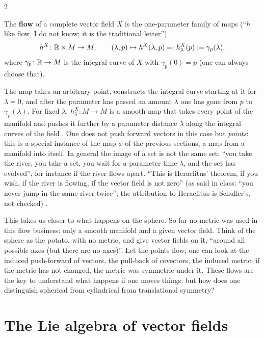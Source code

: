 \begin{paracol}{2}
\begin{definition}\label{def:c11-flow}
The \textbf{flow} of a complete vector field $X$ is the one-parameter family of maps (``$h$ like flow, I do not know; it is the traditional letter'')
\[
  h^X\colon\mathbb{R}\times M\to M,\qquad(\lambda,p)\mapsto h^X(\lambda,p)=:h^X_\lambda(p):=\gamma_p(\lambda),
\]
where $\gamma_p\colon\mathbb{R}\to M$ is the integral curve of $X$ with $\gamma_p(0)=p$ (one can always choose that).
\end{definition}
The map takes an arbitrary point, constructs the integral curve starting at it for $\lambda=0$, and after the parameter has passed an amount $\lambda$ one has gone from $p$ to $\gamma_p(\lambda)$. For fixed $\lambda$, $h^X_\lambda\colon M\to M$ is a smooth map that takes every point of the manifold and pushes it further by a parameter distance $\lambda$ along the integral curves of the field .
One does not push forward vectors in this case but \emph{points}: this is a special instance of the map $\phi$ of the previous sections, a map from a manifold into itself. In general the image of a set is not the same set: ``you take the river, you take a set, you wait for a parameter time $\lambda$, and the set has evolved'', for instance if the river flows apart. ``This is Heraclitus' theorem, if you wish, if the river is flowing, if the vector field is not zero'' (as said in class: ``you never jump in the same river twice''; the attribution to Heraclitus is Schuller's, not checked) .

This takes us closer to what happens on the sphere. So far no metric was used in this flow business: only a smooth manifold and a given vector field. Think of the sphere as the potato, with no metric, and give vector fields on it, ``around all possible axes (but there are no axes)''. Let the points flow; one can look at the induced push-forward of vectors, the pull-back of covectors, the induced metric: if the metric has not changed, the metric was symmetric under it. These flows are the key to understand what happens if one moves things; but how does one distinguish spherical from cylindrical from translational symmetry? 

\section{The Lie algebra of vector fields}\label{sec:c11-lie}


\end{paracol}
